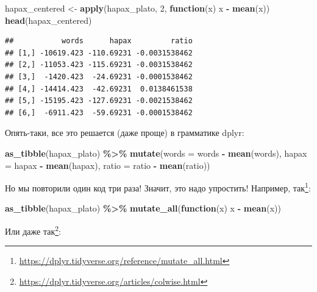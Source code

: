 \documentclass[
]{book}
\newenvironment{Shaded}{\begin{snugshade}}{\end{snugshade}}
\newcommand{\AttributeTok}[1]{\textcolor[rgb]{0.13,0.29,0.53}{#1}}
\newcommand{\ControlFlowTok}[1]{\textcolor[rgb]{0.13,0.29,0.53}{\textbf{#1}}}
\newcommand{\DecValTok}[1]{\textcolor[rgb]{0.00,0.00,0.81}{#1}}
\newcommand{\FunctionTok}[1]{\textcolor[rgb]{0.13,0.29,0.53}{\textbf{#1}}}
\newcommand{\NormalTok}[1]{#1}
\newcommand{\OtherTok}[1]{\textcolor[rgb]{0.56,0.35,0.01}{#1}}
\newcommand{\SpecialCharTok}[1]{\textcolor[rgb]{0.81,0.36,0.00}{\textbf{#1}}}
\theoremstyle{definition}
\theoremstyle{definition}
\theoremstyle{definition}
\theoremstyle{definition}
\theoremstyle{remark}
\begin{document}
\begin{Shaded}
\begin{Highlighting}[]
\NormalTok{hapax\_centered }\OtherTok{\textless{}{-}} \FunctionTok{apply}\NormalTok{(hapax\_plato, }\DecValTok{2}\NormalTok{, }\ControlFlowTok{function}\NormalTok{(x) x }\SpecialCharTok{{-}} \FunctionTok{mean}\NormalTok{(x))}
\FunctionTok{head}\NormalTok{(hapax\_centered)}
\end{Highlighting}
\end{Shaded}

\begin{verbatim}
##           words      hapax         ratio
## [1,] -10619.423 -110.69231 -0.0031538462
## [2,] -11053.423 -115.69231 -0.0031538462
## [3,]  -1420.423  -24.69231 -0.0001538462
## [4,] -14414.423  -42.69231  0.0138461538
## [5,] -15195.423 -127.69231 -0.0021538462
## [6,]  -6911.423  -59.69231 -0.0001538462
\end{verbatim}

Опять-таки, все это решается (даже проще) в грамматике dplyr:

\begin{Shaded}
\begin{Highlighting}[]
\FunctionTok{as\_tibble}\NormalTok{(hapax\_plato) }\SpecialCharTok{\%\textgreater{}\%} 
  \FunctionTok{mutate}\NormalTok{(}\AttributeTok{words =}\NormalTok{ words }\SpecialCharTok{{-}} \FunctionTok{mean}\NormalTok{(words), }
         \AttributeTok{hapax =}\NormalTok{ hapax }\SpecialCharTok{{-}} \FunctionTok{mean}\NormalTok{(hapax),}
         \AttributeTok{ratio =}\NormalTok{ ratio }\SpecialCharTok{{-}} \FunctionTok{mean}\NormalTok{(ratio))}
\end{Highlighting}
\end{Shaded}

Но мы повторили один код три раза! Значит, это надо упростить! Например, так\footnote{\url{https://dplyr.tidyverse.org/reference/mutate_all.html}}:

\begin{Shaded}
\begin{Highlighting}[]
\FunctionTok{as\_tibble}\NormalTok{(hapax\_plato) }\SpecialCharTok{\%\textgreater{}\%} 
  \FunctionTok{mutate\_all}\NormalTok{(}\ControlFlowTok{function}\NormalTok{(x) x }\SpecialCharTok{{-}} \FunctionTok{mean}\NormalTok{(x))}
\end{Highlighting}
\end{Shaded}

Или даже так\footnote{\url{https://dplyr.tidyverse.org/articles/colwise.html}}:
\end{document}
